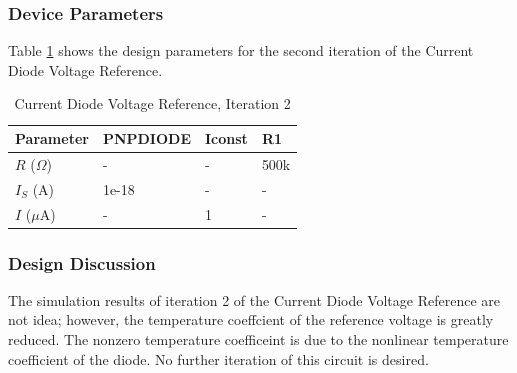 \documentclass[conference]{IEEEtran}
\begin{document}
	\subsubsection{Device Parameters}
Table \ref{tab:cm-dp-2} shows the design parameters for the second iteration of the Current Diode Voltage Reference.
\begin{table}[!htbp]
  \caption[]{Current Diode Voltage Reference, Iteration 2}
  \label{tab:cm-dp-2}
  \centering
  \begin{tabular}{|l|l|l|l|}
    \hline
    Parameter			& PNPDIODE	&Iconst	&R1	\\ \hline
    $R$ ($\Omega$)		&-			&-	&500k 	\\ \hline
    $I_S$ (A)		&1e-18			&-	&-	\\ \hline
    $I$ ($\mu$A)	&-				&1	&-	\\
    \hline
  \end{tabular}
\end{table}
\subsubsection{Design Discussion}
The simulation results of iteration 2 of the Current Diode Voltage Reference are not idea; however, the temperature coeffcient of the reference voltage is greatly reduced.  The nonzero temperature coefficeint is due to the nonlinear temperature coefficient of the diode.  No further iteration of this circuit is desired.

\end{document}

